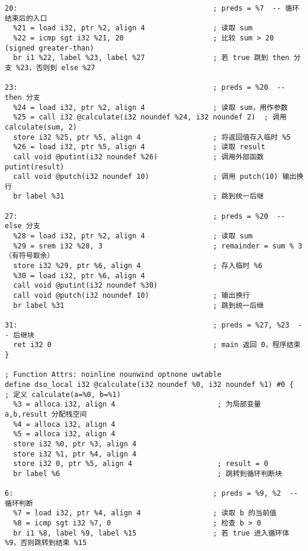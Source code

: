 \documentclass[a4paper]{article}
\begin{document}
\begin{lstlisting}[language=text,caption={test.ll}]
20:                                              ; preds = %7  -- 循环结束后的入口
  %21 = load i32, ptr %2, align 4                ; 读取 sum
  %22 = icmp sgt i32 %21, 20                     ; 比较 sum > 20 (signed greater-than)
  br i1 %22, label %23, label %27                ; 若 true 跳到 then 分支 %23，否则到 else %27

23:                                              ; preds = %20  -- then 分支
  %24 = load i32, ptr %2, align 4                ; 读取 sum，用作参数
  %25 = call i32 @calculate(i32 noundef %24, i32 noundef 2)  ; 调用 calculate(sum, 2)
  store i32 %25, ptr %5, align 4                 ; 将返回值存入临时 %5
  %26 = load i32, ptr %5, align 4                ; 读取 result
  call void @putint(i32 noundef %26)             ; 调用外部函数 putint(result)
  call void @putch(i32 noundef 10)               ; 调用 putch(10) 输出换行
  br label %31                                   ; 跳到统一后继

27:                                              ; preds = %20  -- else 分支
  %28 = load i32, ptr %2, align 4                ; 读取 sum
  %29 = srem i32 %28, 3                          ; remainder = sum % 3（有符号取余）
  store i32 %29, ptr %6, align 4                 ; 存入临时 %6
  %30 = load i32, ptr %6, align 4                
  call void @putint(i32 noundef %30)             
  call void @putch(i32 noundef 10)               ; 输出换行
  br label %31                                   ; 跳到统一后继

31:                                              ; preds = %27, %23  -- 后继块
  ret i32 0                                      ; main 返回 0，程序结束
}

; Function Attrs: noinline nounwind optnone uwtable
define dso_local i32 @calculate(i32 noundef %0, i32 noundef %1) #0 {  ; 定义 calculate(a=%0, b=%1)
  %3 = alloca i32, align 4                        ; 为局部变量 a,b,result 分配栈空间
  %4 = alloca i32, align 4                        
  %5 = alloca i32, align 4                       
  store i32 %0, ptr %3, align 4                  
  store i32 %1, ptr %4, align 4                  
  store i32 0, ptr %5, align 4                    ; result = 0
  br label %6                                     ; 跳转到循环判断块

6:                                               ; preds = %9, %2  -- 循环判断
  %7 = load i32, ptr %4, align 4                 ; 读取 b 的当前值
  %8 = icmp sgt i32 %7, 0                        ; 检查 b > 0
  br i1 %8, label %9, label %15                  ; 若 true 进入循环体 %9，否则跳转到结束 %15


\end{lstlisting}
\end{document}
